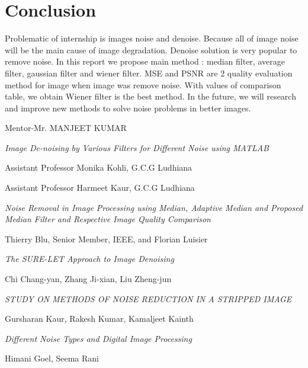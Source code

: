 \chapter{Conclusion}
Problematic of internship is images noise and denoise. Because all of image noise will be the main cause of image degradation. Denoise solution is very popular to remove noise. In this report we propose main method : median filter, average filter, gaussian filter and wiener filter. MSE and PSNR are 2 quality evaluation method for image when image was remove noise. With values of comparison table, we obtain Wiener filter is the best method. In the future, we will research and improve new methods to solve noise problems in better images.



\begin{thebibliography}{9}
	
	
	

    Mentor-Mr. MANJEET KUMAR

    	
    	\textit{Image De-noising by
    	Various Filters for
    	Different Noise using
    	MATLAB }

Assistant Professor Monika Kohli, G.C.G Ludhiana

Assistant Professor Harmeet Kaur, G.C.G Ludhiana

\textit{Noise Removal in Image Processing using Median, Adaptive Median and Proposed Median Filter and Respective Image Quality Comparison}

	Thierry Blu, Senior Member, IEEE, and Florian Luisier
	
	\textit{The SURE-LET Approach to Image Denoising}





Chi Chang-yan, Zhang Ji-xian, Liu Zheng-jun

\textit{STUDY ON METHODS OF NOISE REDUCTION IN A STRIPPED IMAGE}

Gursharan Kaur, Rakesh Kumar, Kamaljeet Kainth

\textit{Different Noise Types and Digital Image Processing}

Himani Goel, Seema Rani


\end{thebibliography}
